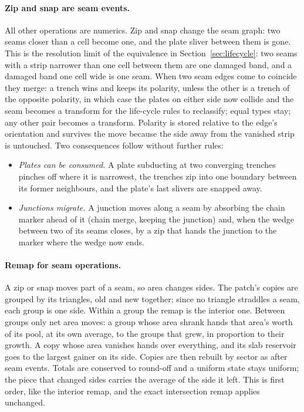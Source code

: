 \documentclass[11pt]{article}
\begin{document}
\paragraph{Zip and snap are seam events.} All other operations are numerics. Zip and snap change the seam graph: two seams closer than a cell become one, and the plate sliver between them is gone. This is the resolution limit of the equivalence in Section~\ref{sec:lifecycle}: two seams with a strip narrower than one cell between them are one damaged band, and a damaged band one cell wide is one seam. When two seam edges come to coincide they merge: a trench wins and keeps its polarity, unless the other is a trench of the opposite polarity, in which case the plates on either side now collide and the seam becomes a transform for the life-cycle rules to reclassify; equal types stay; any other pair becomes a transform. Polarity is stored relative to the edge's orientation and survives the move because the side away from the vanished strip is untouched. Two consequences follow without further rules:
\begin{itemize}
\item \emph{Plates can be consumed.} A plate subducting at two converging trenches pinches off where it is narrowest, the trenches zip into one boundary between its former neighbours, and the plate's last slivers are snapped away.
\item \emph{Junctions migrate.} A junction moves along a seam by absorbing the chain marker ahead of it (chain merge, keeping the junction) and, when the wedge between two of its seams closes, by a zip that hands the junction to the marker where the wedge now ends.
\end{itemize}

\paragraph{Remap for seam operations.} A zip or snap moves part of a seam, so area changes sides. The patch's copies are grouped by its triangles, old and new together; since no triangle straddles a seam, each group is one side. Within a group the remap is the interior one. Between groups only net area moves: a group whose area shrank hands that area's worth of its pool, at its own average, to the groups that grew, in proportion to their growth. A copy whose area vanishes hands over everything, and its slab reservoir goes to the largest gainer on its side. Copies are then rebuilt by sector as after seam events. Totals are conserved to round-off and a uniform state stays uniform; the piece that changed sides carries the average of the side it left. This is first order, like the interior remap, and the exact intersection remap applies unchanged.
\end{document}
